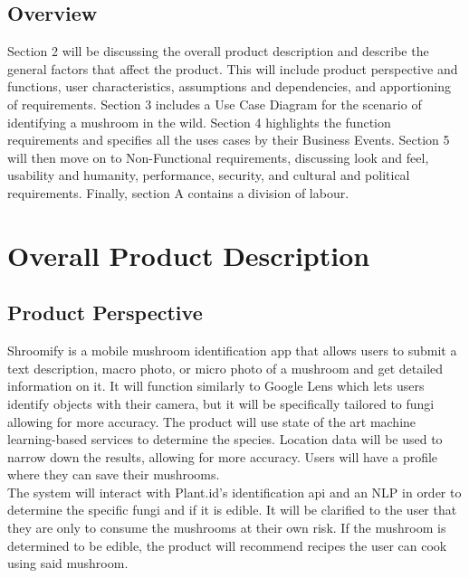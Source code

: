 \documentclass[]{article}
\begin{document}
\subsection{Overview}
\label{sub:overview}

Section 2 will be discussing the overall product description and describe the general factors that affect the product. This will include product perspective and functions, user characteristics, assumptions and dependencies, and apportioning of requirements. Section 3 includes a Use Case Diagram for the scenario of identifying a mushroom in the wild. Section 4 highlights the function requirements and specifies all the uses cases by their Business Events. Section 5 will then move on to Non-Functional requirements, discussing look and feel, usability and humanity, performance, security, and cultural and political requirements. Finally, section A contains a division of labour.



\section{Overall Product Description}
\label{sec:overall_description}


\subsection{Product Perspective}
\label{sub:product_perspective}
Shroomify is a mobile mushroom identification app that allows users to submit a text description, macro photo, or micro photo of a mushroom and get detailed information on it. It will function similarly to Google Lens which lets users identify objects with their camera, but it will be specifically tailored to fungi allowing for more accuracy. The product will use state of the art machine learning-based services to determine the species. Location data will be used to narrow down the results, allowing for more accuracy. Users will have a profile where they can save their mushrooms.\\

The system will interact with Plant.id's identification api and an NLP in order to determine the specific fungi and if it is edible. It will be clarified to the user that they are only to consume the mushrooms at their own risk. If the mushroom is determined to be edible, the product will recommend recipes the user can cook using said mushroom. \\
\end{document}
